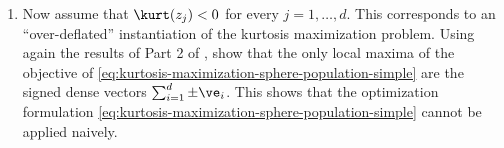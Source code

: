 \documentclass[../../book-main.tex]{subfiles}
\begin{document}
\begin{exercise}
\begin{enumerate}
            , show that the only local
            maxima of the objective of
            \eqref{eq:kurtosis-maximization-sphere-population-simple}
            are the signed one-sparse vectors $\pm \ve_i$ with $i \in
            S^+$. Conclude that the global maximizers of
            \eqref{eq:kurtosis-maximization-sphere-population-simple}
            are the signed one-sparse vectors corresponding to
            components with maximum kurtosis. %
            (\textit{Hint: count the number of positive and negative
                    eigenvalues of the Riemannian Hessian
            \eqref{eq:exercise-riemann-hess-sphere} at each critical point.})
        \item Now assume that $\kurt(z_j) < 0$ for every $j =1,
            \dots, d$. This corresponds to an ``over-deflated''
            instantiation of the kurtosis maximization problem. Using
            again the results of Part 2 of
            , show that the only local
            maxima of the objective of
            \eqref{eq:kurtosis-maximization-sphere-population-simple}
            are the signed dense vectors $\sum_{i=1}^d \pm \ve_i$.
            This shows that the optimization formulation
            \eqref{eq:kurtosis-maximization-sphere-population-simple}
            cannot be applied naively.
    \end{enumerate}
\end{exercise}
\end{document}
